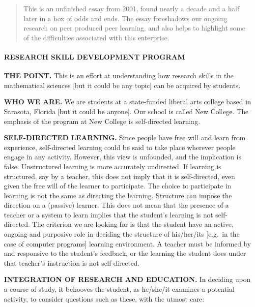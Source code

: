 \begin{quote}
This is an unfinished essay from 2001, found nearly a decade and a half
later in a box of odds and ends. The essay foreshadows our ongoing
research on peer produced peer learning, and also helps to highlight
some of the difficulties associated with this enterprise.
\end{quote}

\paragraph{RESEARCH SKILL DEVELOPMENT
PROGRAM}\label{research-skill-development-program}

\textbf{THE POINT.} This is an effort at understanding how research
skills in the mathematical sciences {[}but it could be any topic{]} can
be acquired by students.

\textbf{WHO WE ARE.} We are students at a state-funded liberal arts
college based in Sarasota, Florida {[}but it could be anyone{]}. Our
school is called New College. The emphasis of the program at New College
is self-directed learning.

\textbf{SELF-DIRECTED LEARNING.} Since people have free will and learn
from experience, self-directed learning could be said to take place
wherever people engage in any activity. However, this view is unfounded,
and the implication is false. Unstructured learning is more accurately
undirected. If learning is structured, say by a teacher, this does not
imply that it is self-directed, even given the free will of the learner
to participate. The choice to participate in learning is not the same as
directing the learning. Structure can impose the direction on a
(passive) learner. This does not mean that the presence of a teacher or
a system to learn implies that the student's learning is not
self-directed. The criterion we are looking for is that the student have
an active, ongoing and purposive role in deciding the structure of
his/her/its {[}e.g.~in the case of computer programs{]} learning
environment. A teacher must be informed by and responsive to the
student's feedback, or the learning the student does under that
teacher's instruction is not self-directed.

\textbf{INTEGRATION OF RESEARCH AND EDUCATION.} In deciding upon a
course of study, it behooves the student, as he/she/it examines a
potential activity, to consider questions such as these, with the utmost
care:

